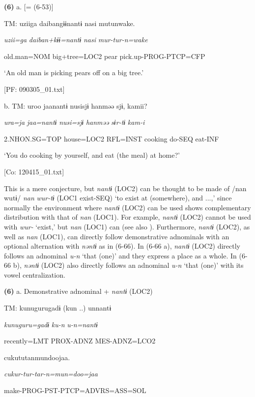 \textbf{(6)}  a.  [= (6-53)]

    TM:  uziiga  daibangɨɨnantɨ  nasi  mutunwake.

      \textit{uzii=ga}  \textit{daiban+kɨɨ=nantɨ}  \textit{nasi}  \textit{mur-tur-n=wake}

      old.man=NOM  big+tree=LOC2  pear  pick.up-PROG-PTCP=CFP

      ‘An old man is picking pears off on a big tree.’

      [PF: 090305\_01.txt]

  b.  TM:  uroo  jaanantɨ  nusisjɨ  hanməə  sjɨ,  kamii?

      \textit{ura=ja}  \textit{jaa=nantɨ}  \textit{nusi=sjɨ}  \textit{hanməə}  \textit{sɨr-tɨ}  \textit{kam-i}

      2.NHON.SG=TOP  house=LOC2  RFL=INST  cooking  do-SEQ  eat-INF

      ‘You do cooking by yourself, and eat (the meal) at home?’

      [Co: 120415\_01.txt]

This is a mere conjecture, but \textit{nantɨ} (LOC2) can be thought to be made of /nan wutɨ/ \textit{nan} \textit{wur-tɨ} (LOC1 exist-SEQ) ‘to exist at (somewhere), and ...,’ since normally the environment where \textit{nantɨ} (LOC2) can be used shows complementary distribution with that of \textit{nan} (LOC1). For example, \textit{nantɨ} (LOC2) cannot be used with \textit{wur-} ‘exist,’ but \textit{nan} (LOC1) can (see also ). Furthermore, \textit{nantɨ} (LOC2), as well as \textit{nan} (LOC1), can directly follow demonstrative adnominals with an optional alternation with \textit{nəntɨ} as in (6-66). In (6-66 a), \textit{nantɨ} (LOC2) directly follows an adnominal \textit{u-n} ‘that (one)’ and they express a place as a whole. In (6-66 b), \textit{nəntɨ} (LOC2) also directly follows an adnominal \textit{u-n} ‘that (one)’ with its vowel centralization.

\textbf{(6)}  a.  Demonstrative adnominal + \textit{nantɨ} (LOC2)

    TM:  kunugurugadɨ  (kun ..)  unnantɨ

      \textit{kunuguru=gadɨ}  \textit{ku-n}  \textit{u-n=nantɨ}

      recently=LMT  PROX-ADNZ  MES-ADNZ=LCO2

      cukututanmundoojaa.

      \textit{cukur-tur-tar-n=mun=doo=jaa}

      make-PROG-PST-PTCP=ADVRS=ASS=SOL


